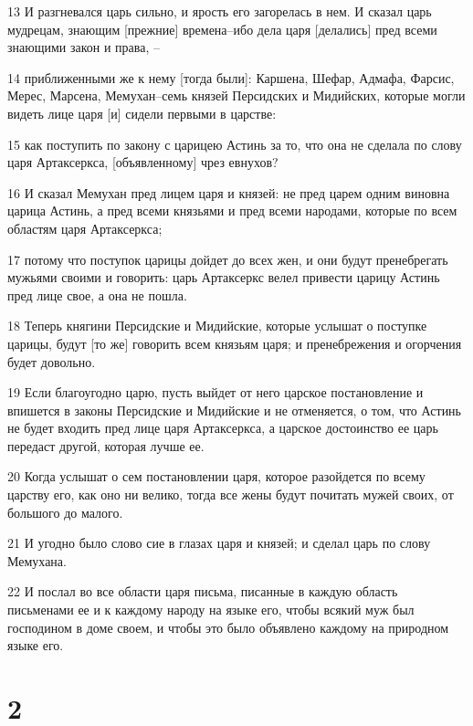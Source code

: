 \par 13 И разгневался царь сильно, и ярость его загорелась в нем. И сказал царь мудрецам, знающим [прежние] времена--ибо дела царя [делались] пред всеми знающими закон и права, --
\par 14 приближенными же к нему [тогда были]: Каршена, Шефар, Адмафа, Фарсис, Мерес, Марсена, Мемухан--семь князей Персидских и Мидийских, которые могли видеть лице царя [и] сидели первыми в царстве:
\par 15 как поступить по закону с царицею Астинь за то, что она не сделала по слову царя Артаксеркса, [объявленному] чрез евнухов?
\par 16 И сказал Мемухан пред лицем царя и князей: не пред царем одним виновна царица Астинь, а пред всеми князьями и пред всеми народами, которые по всем областям царя Артаксеркса;
\par 17 потому что поступок царицы дойдет до всех жен, и они будут пренебрегать мужьями своими и говорить: царь Артаксеркс велел привести царицу Астинь пред лице свое, а она не пошла.
\par 18 Теперь княгини Персидские и Мидийские, которые услышат о поступке царицы, будут [то же] говорить всем князьям царя; и пренебрежения и огорчения будет довольно.
\par 19 Если благоугодно царю, пусть выйдет от него царское постановление и впишется в законы Персидские и Мидийские и не отменяется, о том, что Астинь не будет входить пред лице царя Артаксеркса, а царское достоинство ее царь передаст другой, которая лучше ее.
\par 20 Когда услышат о сем постановлении царя, которое разойдется по всему царству его, как оно ни велико, тогда все жены будут почитать мужей своих, от большого до малого.
\par 21 И угодно было слово сие в глазах царя и князей; и сделал царь по слову Мемухана.
\par 22 И послал во все области царя письма, писанные в каждую область письменами ее и к каждому народу на языке его, чтобы всякий муж был господином в доме своем, и чтобы это было объявлено каждому на природном языке его.

\chapter{2}

